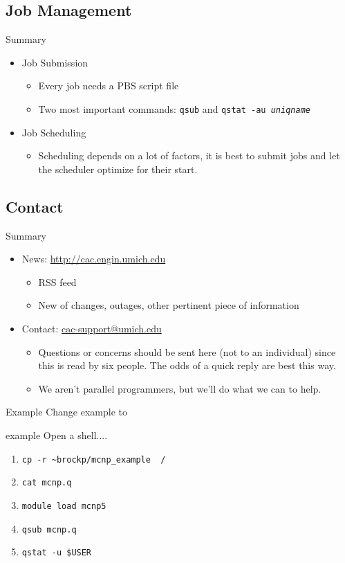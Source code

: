 \documentclass{beamer}
\begin{document}
\subsection{Job Management}
\begin{frame}{Summary}
 \begin{itemize}
   \item Job Submission
     \begin{itemize}
     \item Every job needs a PBS script file
     \item Two most important commands: \texttt{qsub} and \texttt{qstat -au \textit{uniqname}}
     \end{itemize}
   \item Job Scheduling
     \begin{itemize}
     \item Scheduling depends on a lot of factors, it is best to submit jobs and let the
scheduler optimize for their start.
     \end{itemize}
 \end{itemize}
\end{frame}
\subsection{Contact}
\begin{frame}{Summary}
 \begin{itemize}
 \item News: \url{http://cac.engin.umich.edu}
   \begin{itemize}
    \item RSS feed
    \item New of changes, outages, other pertinent piece of information
   \end{itemize}
  \item Contact: \url{cac-support@umich.edu}
   \begin{itemize}
    \item Questions or concerns should be sent here (not to an individual) since
this is read by six people.  The odds of a quick reply are best this way.
    \item We aren't parallel programmers, but we'll do what we can to help.
   \end{itemize}
 \end{itemize}
\end{frame}
\begin{frame}{Example}
 \alert{Change example to}
 \begin{block}{example}
  Open a shell....
  \begin{enumerate}
   \item<1>  \texttt{cp -r \textasciitilde brockp/mcnp\_example ~/}
   \item<2>  \texttt{cat mcnp.q}
   \item<3>  \texttt{module load mcnp5}
   \item<4>  \texttt{qsub mcnp.q}
   \item<5>  \texttt{qstat -u \$USER}
  \end{enumerate}
 \end{block}
\end{frame}
\end{document}
